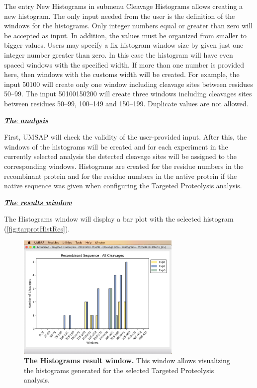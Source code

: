 The entry New Histograms in submenu Cleavage Histograms allows creating a new histogram.
The only input needed from the user is the definition of the windows for the histograms.
Only integer numbers equal or greater than zero will be accepted as input. In addition,
the values must be organized from smaller to bigger values. Users may specify a fix
histogram window size by given just one integer number greater than zero. In this
case the histogram will have even spaced windows with the specified width. If more
than one number is provided here, then windows with the customs width will be created.
For example, the input \numlist{50 100} will create only one window
including cleavage sites between residues \numrange{50}{99}. The input
\numlist{50 100 150 200} will create three windows including cleavages sites between
residues \numrange{50}{99}, \numrange{100}{149} and \numrange{150}{199}. Duplicate values
are not allowed.

\textit{\textbf{\underline{The analysis}}}

First, UMSAP will check the validity of the user-provided input. After this, the
windows of the histograms will be created and for each experiment in the currently
selected analysis the detected cleavage sites will be assigned to the corresponding
windows. Histograms are created for the residue numbers in the recombinant protein
and for the residue numbers in the native protein if the native sequence was given
when configuring the Targeted Proteolysis analysis.

\textit{\textbf{\underline{The results window}}}

The Histograms window will display a bar plot with the selected histogram 
(\autoref{fig:tarprotHistRes}).

\begin{figure}[h]
    \centering
    \includegraphics[width=0.7\textwidth]{./IMAGES/MOD-TARPROT/tarprot-hist.jpg}
    \caption[The Histograms result window]{\textbf{The Histograms result window.}
    This window allows visualizing the histograms generated for the selected Targeted
    Proteolysis analysis.}
    \label{fig:tarprotHistRes}
    \vspace{-5pt}
\end{figure}

